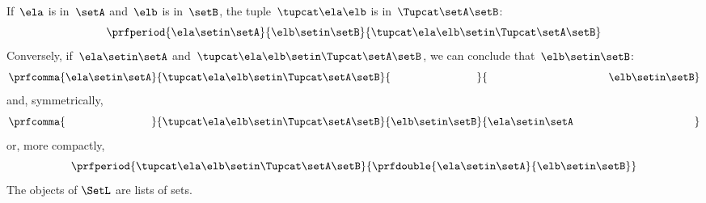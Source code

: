 {    If~$\ela$ is in~$\setA$ and~$\elb$ is in~$\setB$, the tuple~$\tupcat \ela \elb$ is in~$\Tupcat \setA \setB$:
    \begin{equation}
        \label{eq:sets-monoid-axiom1}
        \prfperiod{
            \ela \setin \setA
        }{
            \elb \setin \setB
        }{
            \tupcat \ela \elb \setin \Tupcat \setA \setB
        }
    \end{equation}
    Conversely, if~$\ela \setin \setA$ and~$\tupcat \ela \elb \setin \Tupcat \setA \setB$, we can conclude that~$\elb \setin \setB$:
    \begin{equation}
        \label{eq:sets-monoid-axiom2}
        \prfcomma{
            \ela \setin \setA
        }{
            \tupcat \ela \elb \setin \Tupcat \setA  \setB
        }{
            \phantom{\elb \setin \setB}
        }{
            \rule{39mm}{0pt} \elb \setin  \setB
        }
    \end{equation}
    and, symmetrically,
    \begin{equation}
        \label{eq:sets-monoid-axiom3}
        \prfcomma{
            \phantom{\ela \setin \setA}
        }{
            \tupcat \ela \elb \setin \Tupcat \setA \setB
        }{
            \elb \setin \setB
        }{
            \ela \setin  \setA \rule{39mm}{0pt}
        }
    \end{equation}
    or, more compactly,
    \begin{equation}
        \label{eq:sets-monoid-axiom3bis}
        \prfperiod{
            \tupcat \ela \elb \setin \Tupcat \setA \setB
        }{
            \prfdouble{
                \ela \setin \setA
            }{
                \elb \setin \setB
            }
        }
    \end{equation}
}
The objects of $\SetL$ are lists of sets.
%
